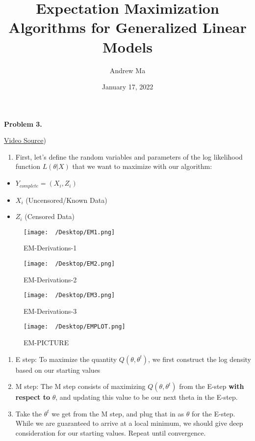 \documentclass[
]{article}
\title{Expectation Maximization Algorithms for Generalized Linear
Models}
\author{Andrew Ma}
\date{January 17, 2022}
\providecommand{\tightlist}{%
  \setlength{\itemsep}{0pt}\setlength{\parskip}{0pt}}
\begin{document}
\maketitle

\textbf{Problem 3.}

\href{https://www.youtube.com/watch?v=Ydhrz3IWM2I\&list=PLmM_3MA2HWpauQtozhzRYzYWigz4Ru44K\&index=6,}{Video
Source})

\begin{enumerate}
\def\labelenumi{\alph{enumi}.}
\tightlist
\item
  First, let's define the random variables and parameters of the log
  likelihood function \(L(\theta|X)\) that we want to maximize with our
  algorithm:
\end{enumerate}

\begin{itemize}
\tightlist
\item
  \(Y_{complete} = (X_i,Z_i)\)
\item
  \(X_i\) (Uncensored/Known Data)
\item
  \(Z_i\) (Censored Data)
\end{itemize}

\begin{figure}
\centering
\texttt{[image: ~/Desktop/EM1.png]}
\caption{EM-Derivations-1}
\end{figure}

\begin{figure}
\centering
\texttt{[image: ~/Desktop/EM2.png]}
\caption{EM-Derivations-2}
\end{figure}

\begin{figure}
\centering
\texttt{[image: ~/Desktop/EM3.png]}
\caption{EM-Derivations-3}
\end{figure}

\begin{figure}
\centering
\texttt{[image: ~/Desktop/EMPLOT.png]}
\caption{EM-PICTURE}
\end{figure}

\begin{enumerate}
\def\labelenumi{\roman{enumi})}
\item
  E step: To maximize the quantity \(Q(\theta,\theta^t)\), we first
  construct the log density based on our starting values
\item
  M step: The M step consists of maximizing \(Q(\theta,\theta^t)\) from
  the E-step \textbf{with respect to} \(\theta\), and updating this
  value to be our next theta in the E-step.
\item
  Take the \(\theta^t\) we get from the M step, and plug that in as
  \(\theta\) for the E-step. While we are guaranteed to arrive at a
  local minimum, we should give deep consideration for our starting
  values. Repeat until convergence.
\end{enumerate}
\end{document}
